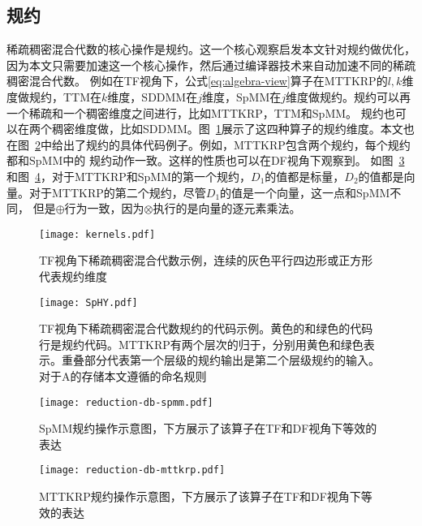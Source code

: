 \subsection{规约}\label{sec:reduction-core}
稀疏稠密混合代数的核心操作是规约。这一个核心观察启发本文针对规约做优化，因为本文只需要加速这一个核心操作，然后通过编译器技术来自动加速不同的稀疏稠密混合代数。
例如在TF视角下，公式\eqref{eq:algebra-view}算子在MTTKRP的$l,k$维度做规约，TTM在$k$维度，SDDMM在$j$维度，SpMM在$j$维度做规约。规约可以再一个稀疏和一个稠密维度之间进行，比如MTTKRP，TTM和SpMM。
规约也可以在两个稠密维度做，比如SDDMM。图~\ref{fig:kernels}展示了这四种算子的规约维度。本文也在图~\ref{fig:four-code}中给出了规约的具体代码例子。例如，MTTKRP包含两个规约，每个规约都和SpMM中的
规约动作一致。这样的性质也可以在DF视角下观察到。 如图~\ref{fig:redb-spmm}和图~\ref{fig:redb-mttkrp}，对于MTTKRP和SpMM的第一个规约，$D_1$的值都是标量，$D_2$的值都是向量。对于MTTKRP的第二个规约，尽管$D_1$的值是一个向量，这一点和SpMM不同，
但是$\oplus$行为一致，因为$\otimes$执行的是向量的逐元素乘法。
\begin{figure}[h]%
  \centering
  \texttt{[image: kernels.pdf]}
  \caption{TF视角下稀疏稠密混合代数示例，连续的灰色平行四边形或正方形代表规约维度}
  \label{fig:kernels}
\end{figure}
\begin{figure}[h]%
  \centering
  \texttt{[image: SpHY.pdf]}
  \caption{TF视角下稀疏稠密混合代数规约的代码示例。黄色的和绿色的代码行是规约代码。MTTKRP有两个层次的归于，分别用黄色和绿色表示。重叠部分代表第一个层级的规约输出是第二个层级规约的输入。对于A的存储本文遵循\cite{kjolstad:2020:phd-thesis}的命名规则}
  \label{fig:four-code}
\end{figure}
\begin{figure}[h]%
  \centering
  \texttt{[image: reduction-db-spmm.pdf]}
  \caption{SpMM规约操作示意图，下方展示了该算子在TF和DF视角下等效的表达}
  \label{fig:redb-spmm}
\end{figure}
\begin{figure}[h]%
  \centering
  \texttt{[image: reduction-db-mttkrp.pdf]}
  \caption{MTTKRP规约操作示意图，下方展示了该算子在TF和DF视角下等效的表达}
  \label{fig:redb-mttkrp}
\end{figure}

